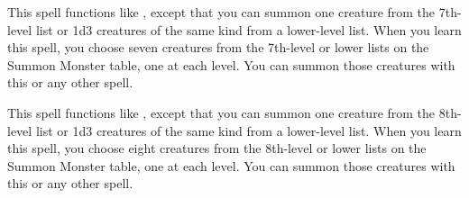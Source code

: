 \begin{spelleffect}
  This spell functions like , except that you can summon one creature from the 7th-level list or 1d3 creatures of the same kind from a lower-level list. When you learn this spell, you choose seven creatures from the 7th-level or lower lists on the Summon Monster table, one at each level. You can summon those creatures with this or any other  spell.
\end{spelleffect}

\begin{spelleffect}
  This spell functions like , except that you can summon one creature from the 8th-level list or 1d3 creatures of the same kind from a lower-level list. When you learn this spell, you choose eight creatures from the 8th-level or lower lists on the Summon Monster table, one at each level. You can summon those creatures with this or any other  spell.
\end{spelleffect}

